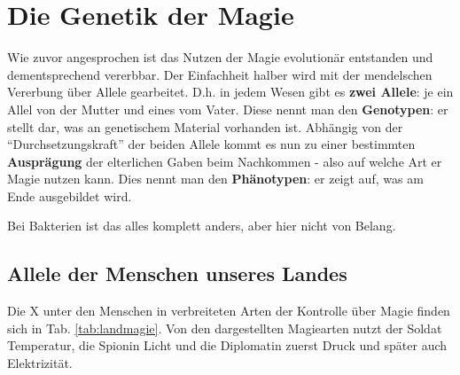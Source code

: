 \section{Die Genetik der Magie}
Wie zuvor angesprochen ist das Nutzen der Magie evolutionär entstanden und dementsprechend vererbbar.
Der Einfachheit halber wird mit der mendelschen Vererbung über Allele gearbeitet.
D.h. in jedem Wesen gibt es \textbf{zwei Allele}: je ein Allel von der Mutter und eines vom Vater.
Diese nennt man den \textbf{Genotypen}: er stellt dar, was an genetischem Material vorhanden ist.
Abhängig von der "`Durchsetzungskraft"' der beiden Allele kommt es nun zu einer bestimmten \textbf{Ausprägung} der elterlichen Gaben beim Nachkommen - also auf welche Art er Magie nutzen kann.
Dies nennt man den \textbf{Phänotypen}: er zeigt auf, was am Ende ausgebildet wird.

Bei Bakterien ist das alles komplett anders, aber hier nicht von Belang.


\subsection{Allele der Menschen unseres Landes} %
Die X %
unter den Menschen in  verbreiteten Arten der Kontrolle über Magie finden sich in Tab. \ref{tab:landmagie}.
Von den dargestellten Magiearten nutzt der Soldat Temperatur, %
die Spionin Licht %
und die Diplomatin zuerst Druck und später auch Elektrizität. %

